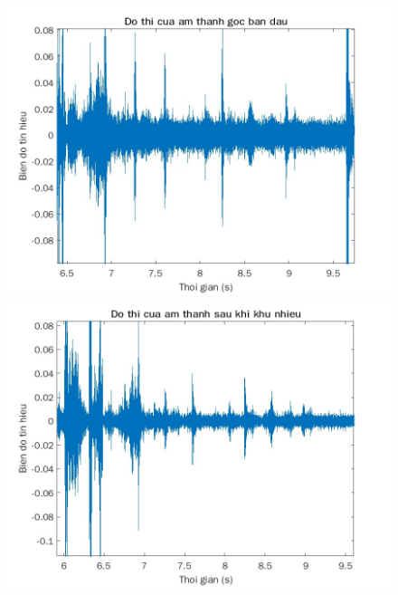 \begin{figure}[!ht]
	\begin{minipage}[b]{0.4\textwidth}
		\centering
		\includegraphics[scale=0.3]{goc_zoom}
	\end{minipage}
	\hfill
	\begin{minipage}[b]{0.4\textwidth}
		\centering
		\includegraphics[scale=0.3]{khu_zoom}
	\end{minipage}
\end{figure}\\

